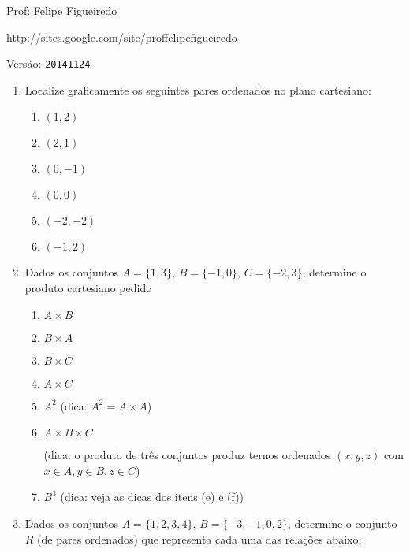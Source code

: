 \documentclass[a4paper]{article}
\begin{document}
\parbox[c]{.825\textwidth}{\raggedright%
{Prof: Felipe Figueiredo\par}
{\url{http://sites.google.com/site/proffelipefigueiredo}}
}

Versão: \verb|20141124|



\begin{enumerate}
\item Localize graficamente os seguintes pares ordenados no plano
  cartesiano:
  \begin{enumerate}
  \item $(1,2)$
  \item $(2,1)$
  \item $(0,-1)$
  \item $(0,0)$
  \item $(-2,-2)$
  \item $(-1,2)$
  \end{enumerate}

\item Dados os conjuntos $A=\{1,3\}$, $B=\{-1,0\}$,
  $C=\{-2,3\}$, determine o produto cartesiano pedido
  \begin{enumerate}
  \item $A \times B$
  \item $B \times A$
  \item $B \times C$
  \item $A \times C$
  \item $A^2$ (dica: $A^2 = A \times A$)
  \item $A \times B \times C$ 

    (dica: o produto de três conjuntos produz ternos ordenados
    $(x,y,z)$ com $x \in A, y \in B, z \in C$)

  \item $B^3$ (dica: veja as dicas dos itens (e) e (f))
  \end{enumerate}

\item Dados os conjuntos $A=\{1,2,3,4\}$, $B=\{-3,-1,0,2\}$, determine
  o conjunto $R$ (de pares ordenados) que representa cada uma das
  relações abaixo:


\end{enumerate}
\end{document}
